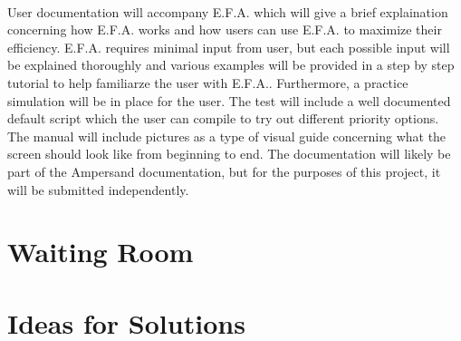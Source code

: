 \documentclass[12pt]{report}
\begin{document}
\paragraph*{}
 User documentation will accompany E.F.A. which will give a brief explaination concerning 
how E.F.A. works and how users can use E.F.A. to maximize their efficiency. E.F.A. requires minimal 
input from user, but each possible input will be explained thoroughly and various examples will be 
provided in a step by step tutorial to help familiarze the user with E.F.A.. Furthermore, a 
practice simulation will be in place for the user. The test will include a well documented default 
script which the user can compile to try out different priority options. The manual will include 
pictures as a type of visual guide concerning what the screen should look like from beginning to 
end. The documentation will likely be part of the Ampersand documentation, but for the purposes of 
this project, it will be submitted independently. 

\section{Waiting Room}\label{sec:Waiting}
\section{Ideas for Solutions}\label{sec:Solutions}




\end{document}

